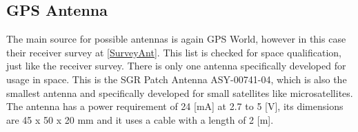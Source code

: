 \documentclass[11pt]{report}
\begin{document}
\subsection{GPS Antenna}
The main source for possible antennas is again GPS World, however in this case their receiver survey at \ref{SurveyAnt}. This list is checked for space qualification, just like the receiver survey. There is only one antenna specifically developed for usage in space. This is the SGR Patch Antenna ASY-00741-04, which is also the smallest antenna and specifically developed for small satellites like microsatellites.
The antenna has a power requirement of 24 [mA] at 2.7 to 5 [V], its dimensions are 45 x 50 x 20 mm and it uses a cable with a length of 2 [m].
\end{document}
